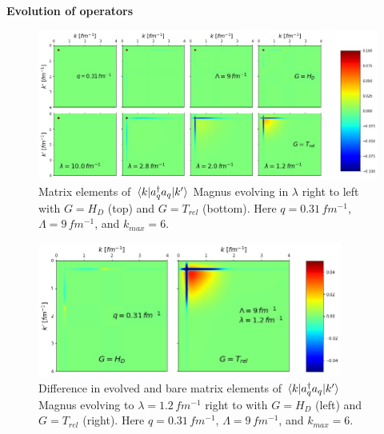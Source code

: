 \documentclass[preprintnumbers,floatfix,aps,prc,preprint,nofootinbib]{revtex4-1}
\begin{document}
%
\textbf{Evolution of operators}
%
\begin{figure}[H]
  	\captionsetup{singlelinecheck=false,justification=raggedright}
  	\centering
 	\includegraphics[width=14cm]{momentum_proj_operator_contours_q0,31_magnus_Wendt_Lamb9}
  	\hspace*{0.05\textwidth}
  	\caption{Matrix elements of $\mel{k}{a^{\dagger}_q a_q}{k'}$ Magnus evolving in $\lambda$ right to left with $G=H_D$ (top) and $G=T_{rel}$ (bottom). Here $q=0.31 \, fm^{-1}$, $\Lambda=9 \, fm^{-1}$, and $k_{max}=6$.}
  	\label{fig:momentum_proj_operator_contours_q0,31_magnus_Wendt_Lamb9}
\end{figure}
%
\begin{figure}[H]
	\captionsetup{singlelinecheck=false,justification=raggedright}
	\centering
  	\includegraphics[width=10cm]{momentum_proj_difference_q0,31_magnus_Wendt_Lamb9}
  	\hspace*{0.05\textwidth}
  	\caption{Difference in evolved and bare matrix elements of $\mel{k}{a^{\dagger}_q a_q}{k'}$ Magnus evolving to $\lambda=1.2 \, fm^{-1}$ right to with $G=H_D$ (left) and $G=T_{rel}$ (right). Here $q=0.31 \, fm^{-1}$, $\Lambda=9 \, fm^{-1}$, and $k_{max}=6$.}
  	\label{fig:momentum_proj_operator_difference_q0,31_magnus_Wendt_Lamb9}
\end{figure}
%
\end{document}
